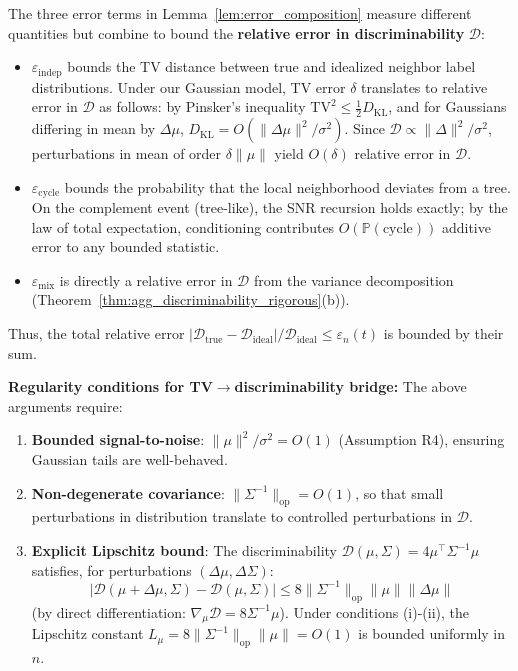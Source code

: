\begin{remark}
\label{rem:error_metric}
The three error terms in Lemma~\ref{lem:error_composition} measure different quantities but combine to bound the \textbf{relative error in discriminability} $\mathcal{D}$:
\begin{itemize}
    \item $\varepsilon_{\mathrm{indep}}$ bounds the TV distance between true and idealized neighbor label distributions. Under our Gaussian model, TV error $\delta$ translates to relative error in $\mathcal{D}$ as follows: by Pinsker's inequality $\mathrm{TV}^2 \leq \frac{1}{2} D_{\mathrm{KL}}$, and for Gaussians differing in mean by $\Delta\mu$, $D_{\mathrm{KL}} = O(\|\Delta\mu\|^2/\sigma^2)$. Since $\mathcal{D} \propto \|\Delta\|^2/\sigma^2$, perturbations in mean of order $\delta\|\mu\|$ yield $O(\delta)$ relative error in $\mathcal{D}$.
    \item $\varepsilon_{\mathrm{cycle}}$ bounds the probability that the local neighborhood deviates from a tree. On the complement event (tree-like), the SNR recursion holds exactly; by the law of total expectation, conditioning contributes $O(\mathbb{P}(\text{cycle}))$ additive error to any bounded statistic.
    \item $\varepsilon_{\mathrm{mix}}$ is directly a relative error in $\mathcal{D}$ from the variance decomposition (Theorem~\ref{thm:agg_discriminability_rigorous}(b)).
\end{itemize}
Thus, the total relative error $|\mathcal{D}_{\mathrm{true}} - \mathcal{D}_{\mathrm{ideal}}|/\mathcal{D}_{\mathrm{ideal}} \leq \varepsilon_n(t)$ is bounded by their sum.

\textbf{Regularity conditions for TV$\to$discriminability bridge:} The above arguments require:
\begin{enumerate}
    \item[(i)] \textbf{Bounded signal-to-noise}: $\|\mu\|^2/\sigma^2 = O(1)$ (Assumption R4), ensuring Gaussian tails are well-behaved.
    \item[(ii)] \textbf{Non-degenerate covariance}: $\|\Sigma^{-1}\|_{\mathrm{op}} = O(1)$, so that small perturbations in distribution translate to controlled perturbations in $\mathcal{D}$.
    \item[(iii)] \textbf{Explicit Lipschitz bound}: The discriminability $\mathcal{D}(\mu, \Sigma) = 4\mu^\top\Sigma^{-1}\mu$ satisfies, for perturbations $(\Delta\mu, \Delta\Sigma)$:
    \begin{equation}
        |\mathcal{D}(\mu + \Delta\mu, \Sigma) - \mathcal{D}(\mu, \Sigma)| \leq 8\|\Sigma^{-1}\|_{\mathrm{op}} \|\mu\| \|\Delta\mu\|
    \end{equation}
    (by direct differentiation: $\nabla_\mu \mathcal{D} = 8\Sigma^{-1}\mu$). Under conditions (i)-(ii), the Lipschitz constant $L_\mu = 8\|\Sigma^{-1}\|_{\mathrm{op}} \|\mu\| = O(1)$ is bounded uniformly in $n$.
\end{enumerate}


\end{remark}
